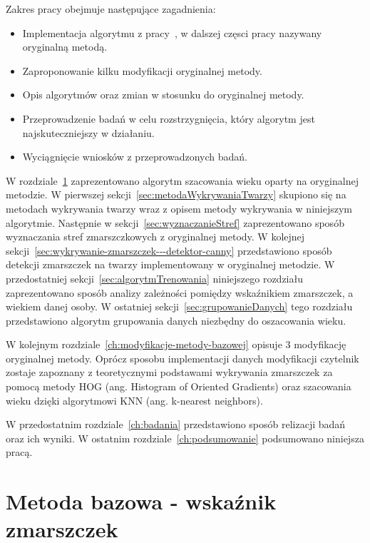 \documentclass[a4paper,twoside,12pt]{book}
\begin{document}
    Zakres pracy obejmuje następujące zagadnienia:
    \begin{itemize}
        \item Implementacja algorytmu z pracy~\cite{wrinkleFeatures}, w dalszej częsci pracy nazywany oryginalną metodą.
        \item Zaproponowanie kilku modyfikacji oryginalnej metody.
        \item Opis algorytmów oraz zmian w stosunku do oryginalnej metody.
        \item Przeprowadzenie badań w celu rozstrzygnięcia, który algorytm jest najskuteczniejszy w działaniu.
        \item Wyciągnięcie wniosków z przeprowadzonych badań.
    \end{itemize}
    W rozdziale~\ref{ch:metoda-bazowa---wrinkle-feature} zaprezentowano algorytm szacowania wieku oparty na oryginalnej metodzie.
    W pierwszej sekcji~\ref{sec:metodaWykrywaniaTwarzy} skupiono się na metodach wykrywania twarzy wraz z opisem metody wykrywania w niniejszym
    algorytmie.
    Następnie w sekcji~\ref{sec:wyznaczanieStref} zaprezentowano sposób wyznaczania stref zmarszczkowych z oryginalnej metody.
    W kolejnej sekcji~\ref{sec:wykrywanie-zmarszczek---detektor-canny} przedstawiono sposób detekcji zmarszczek na twarzy implementowany
    w oryginalnej metodzie.
    W przedostatniej sekcji~\ref{sec:algorytmTrenowania} niniejszego rozdziału zaprezentowano sposób analizy %
    zależności pomiędzy wskaźnikiem zmarszczek, a wiekiem
    danej osoby.
    W ostatniej sekcji~\ref{sec:grupowanieDanych} tego rozdziału przedstawiono algorytm grupowania danych niezbędny do oszacowania wieku.

    W kolejnym rozdziale~\ref{ch:modyfikacje-metody-bazowej} opisuje 3 modyfikację oryginalnej metody.
    Oprócz sposobu implementacji danych modyfikacji czytelnik zostaje zapoznany z teoretycznymi podstawami wykrywania zmarszczek za
    pomocą metody HOG (ang. Histogram of Oriented Gradients) oraz szacowania wieku dzięki algorytmowi KNN (ang.  k-nearest neighbors).

    W przedostatnim rozdziale~\ref{ch:badania} przedstawiono sposób relizacji badań oraz ich wyniki.
    W ostatnim rozdziale~\ref{ch:podsumowanie} podsumowano niniejsza pracą.

    \chapter{Metoda bazowa - wskaźnik zmarszczek}\label{ch:metoda-bazowa---wrinkle-feature}
\end{document}
